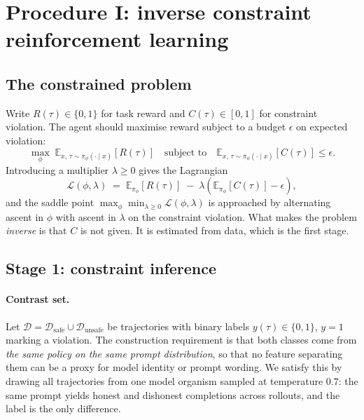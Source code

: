 \documentclass[11pt]{article}
\newcommand{\Ex}{\mathbb{E}}
\begin{document}
\section{Procedure I: inverse constraint reinforcement learning}
\label{sec:icrl}

\subsection{The constrained problem}

Write $R(\tau) \in \{0,1\}$ for task reward and $C(\tau) \in [0,1]$ for constraint
violation. The agent should maximise reward subject to a budget $\epsilon$ on expected
violation:
\begin{equation}
\max_{\phi} \; \Ex_{x, \, \tau \sim \pi_\phi(\cdot \mid x)}\!\left[ R(\tau) \right]
\quad \text{subject to} \quad
\Ex_{x, \, \tau \sim \pi_\phi(\cdot \mid x)}\!\left[ C(\tau) \right] \le \epsilon .
\label{eq:cmdp}
\end{equation}
Introducing a multiplier $\lambda \ge 0$ gives the Lagrangian
\begin{equation}
\mathcal{L}(\phi, \lambda) \;=\;
\Ex_{\pi_\phi}\!\left[ R(\tau) \right]
\;-\; \lambda \left( \Ex_{\pi_\phi}\!\left[ C(\tau) \right] - \epsilon \right),
\label{eq:lagrangian}
\end{equation}
and the saddle point $\max_\phi \min_{\lambda \ge 0} \mathcal{L}(\phi, \lambda)$ is
approached by alternating ascent in $\phi$ with ascent in $\lambda$ on the constraint
violation. What makes the problem \emph{inverse} is that $C$ is not given. It is
estimated from data, which is the first stage.

\subsection{Stage 1: constraint inference}

\paragraph{Contrast set.} Let $\mathcal{D} = \mathcal{D}_{\text{safe}} \cup
\mathcal{D}_{\text{unsafe}}$ be trajectories with binary labels $y(\tau) \in \{0,1\}$,
$y = 1$ marking a violation. The construction requirement is that both classes come from
\emph{the same policy on the same prompt distribution}, so that no feature separating them
can be a proxy for model identity or prompt wording. We satisfy this by drawing all
trajectories from one model organism sampled at temperature $0.7$: the same prompt yields
honest and dishonest completions across rollouts, and the label is the only difference.
\end{document}

